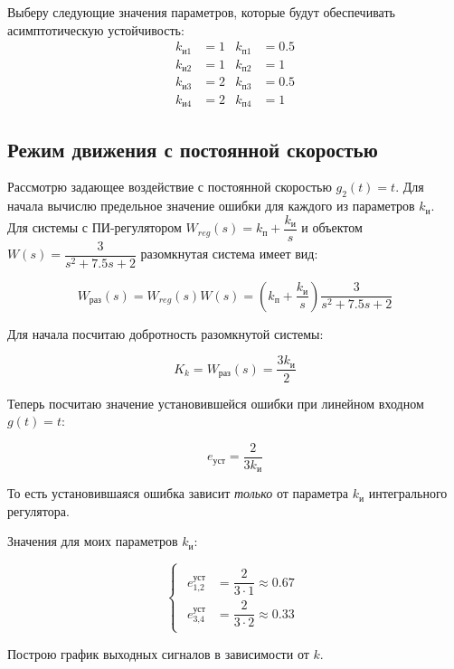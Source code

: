 \documentclass[a4paper,12pt]{article}
\begin{document}
	
	Выберу следующие значения параметров, которые будут обеспечивать асимптотическую устойчивость:
	\[
	\begin{aligned}
		k_{\text{и}1} &= 1 & k_{\text{п}1} &= 0.5 \\
		k_{\text{и}2} &= 1 & k_{\text{п}2} &= 1 \\
		k_{\text{и}3} &= 2 & k_{\text{п}3} &= 0.5 \\
		k_{\text{и}4} &= 2 & k_{\text{п}4} &= 1
	\end{aligned}
	\]

	\subsection{Режим движения с постоянной скоростью}
	
	Рассмотрю задающее воздействие с постоянной скоростью $g_2(t) = t$. 
	Для начала вычислю предельное значение ошибки для каждого из параметров \(k_\text{и}\).\\
	
	Для системы с ПИ-регулятором 
	$W_{reg}(s) = k_\text{п} + \dfrac{k_\text{и}}{s}$ 
	и объектом 
	$W(s) = \dfrac{3}{s^2 + 7.5s + 2}$ 
	разомкнутая система имеет вид:
	
	\[
	W_{\text{раз}}(s) = W_{reg}(s)W(s) = 
	\left(k_\text{п} + \frac{k_\text{и}}{s}\right)\frac{3}{s^2 + 7.5s + 2}
	\]
	
	Для начала посчитаю добротность разомкнутой системы:
	
	\[
	K_k = W_{\text{раз}}(s) = \frac{3k_\text{и}}{2}
	\]
	
	Теперь посчитаю значение установившейся ошибки при линейном входном \(g(t) = t\):
	
	\[
	e_\text{уст} = \frac{2}{3k_\text{и}}
	\]
	
	То есть установившаяся ошибка зависит \textit{только} от параметра \(k_\text{и}\) интегрального регулятора.
	
	Значения для моих параметров \(k_\text{и}\):
	
	\[
	\begin{cases}\begin{aligned}
			e_\text{1,2}^\text{уст} &= \dfrac{2}{3 \cdot 1} \approx 0.67 \\
			e_\text{3,4}^\text{уст} &= \dfrac{2}{3 \cdot 2} \approx 0.33
	\end{aligned}\end{cases}
	\]
	
	Построю график выходных сигналов в зависимости от \(k\).
	
\end{document}
